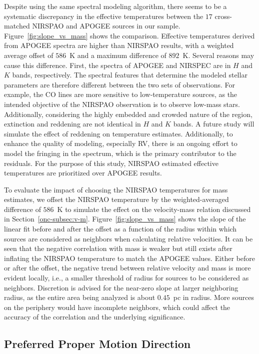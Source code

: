\documentclass[12pt]{ucsddissertation}
\begin{document}
\begin{CJK*}{UTF8}{gbsn}
Despite using the same spectral modeling algorithm, there seems to be a systematic discrepancy in the effective temperatures between the $17$ cross-matched NIRSPAO and APOGEE sources in our sample. Figure~\ref{fig:slope_vs_mass} shows the comparison. Effective temperatures derived from APOGEE spectra are higher than NIRSPAO results, with a weighted average offset of $586$~K and a maximum difference of $892$~K. Several reasons may cause this difference. First, the spectra of APOGEE and NIRSPEC are in $H$ and $K$ bands, respectively. The spectral features that determine the modeled stellar parameters are therefore different between the two sets of observations. For example, the CO lines are more sensitive to low-temperature sources, as the intended objective of the NIRSPAO observation is to observe low-mass stars. Additionally, considering the highly embedded and crowded nature of the region, extinction and reddening are not identical in $H$ and $K$ bands. A future study will simulate the effect of reddening on temperature estimates. Additionally, to enhance the quality of modeling, especially RV, there is an ongoing effort to model the fringing in the spectrum, which is the primary contributor to the residuals.  For the purpose of this study, NIRSPAO estimated effective temperatures are prioritized over APOGEE results.

To evaluate the impact of choosing the NIRSPAO temperatures for mass estimates, we offset the NIRSPAO temperature by the weighted-averaged difference of $586$~K to simulate the effect on the velocity-mass relation discussed in Section~\ref{onc-subsec:v-m}. Figure~\ref{fig:slope_vs_mass} shows the slope of the linear fit before and after the offset as a function of the radius within which sources are considered as neighbors when calculating relative velocities. It can be seen that the negative correlation with mass is weaker but still exists after inflating the NIRSPAO temperature to match the APOGEE values. Either before or after the offset, the negative trend between relative velocity and mass is more evident locally, i.e., a smaller threshold of radius for sources to be considered as neighbors. Discretion is advised for the near-zero slope at larger neighboring radius, as the entire area being analyzed is about $0.45$~pc in radius. More sources on the periphery would have incomplete neighbors, which could affect the accuracy of the correlation and the underlying significance.


\subsection{Preferred Proper Motion Direction}
\label{onc-subsec:pm}


\end{CJK*}
\end{document}
